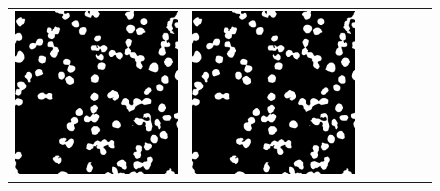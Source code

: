 \begin{figure}[H]
\begin{tabularx}{\textwidth}{YYYYYYY}
            \includegraphics{bilder/ER/segmentation/pp_5.png} &
            \includegraphics{bilder/ER/segmentation/pp_6.png} &

\end{tabularx}
\end{figure}
